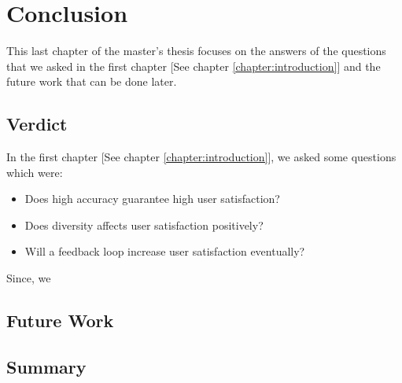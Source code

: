 
\chapter{Conclusion}\label{chapter:conclusion}

This last chapter of the master's thesis focuses on the answers of the questions that we asked in the first chapter [See chapter \ref{chapter:introduction}] and the future work that can be done later.

\section{Verdict}

In the first chapter [See chapter \ref{chapter:introduction}], we asked some questions which were: 

\begin{itemize}
	\item Does high accuracy guarantee high user satisfaction?
	\item Does diversity affects user satisfaction positively?
	\item Will a feedback loop increase user satisfaction eventually?
\end{itemize}

Since, we 
\section{Future Work}

\section{Summary}

